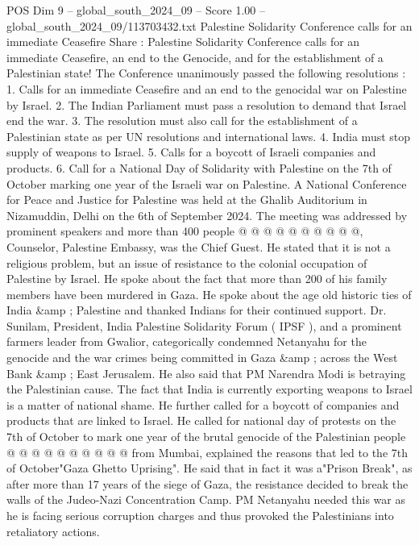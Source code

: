 \begin{textsample}{POS Dim 9 – global\_south\_2024\_09 – Score 1.00 – global\_south\_2024\_09/113703432.txt}  \label{ex:f9_pos_254}
Palestine Solidarity Conference calls for an immediate Ceasefire Share : Palestine Solidarity Conference calls for an immediate Ceasefire, an end to the Genocide, and for the establishment of a Palestinian state!
The Conference unanimously passed the following resolutions : 1.
Calls for an immediate Ceasefire and an end to the genocidal war on Palestine by Israel. 2.
The Indian Parliament must pass a resolution to demand that Israel end the war. 3.
The resolution must also call for the establishment of a Palestinian state as per UN resolutions and international laws. 4.
India must stop supply of weapons to Israel. 5.
Calls for a boycott of Israeli companies and products. 6.
Call for a National Day of Solidarity with Palestine on the 7th of October marking one year of the Israeli war on Palestine.
A National Conference for Peace and Justice for Palestine was held at the Ghalib Auditorium in Nizamuddin, Delhi on the 6th of September 2024.
The meeting was addressed by prominent speakers and more than 400 people @ @ @ @ @ @ @ @ @ @, Counselor, Palestine Embassy, was the Chief Guest.
He stated that it is not a religious problem, but an issue of resistance to the colonial occupation of Palestine by Israel.
He spoke about the fact that more than 200 of his family members have been murdered in Gaza.
He spoke about the age old historic ties of India \&amp ; Palestine and thanked Indians for their continued support.
Dr.
Sunilam, President, India Palestine Solidarity Forum ( IPSF ), and a prominent farmers leader from Gwalior, categorically condemned Netanyahu for the genocide and the war crimes being committed in Gaza \&amp ; across the West Bank \&amp ; East Jerusalem.
He also said that PM Narendra Modi is betraying the Palestinian cause.
The fact that India is currently exporting weapons to Israel is a matter of national shame.
He further called for a boycott of companies and products that are linked to Israel.
He called for national day of protests on the 7th of October to mark one year of the brutal genocide of the Palestinian people @ @ @ @ @ @ @ @ @ @ from Mumbai, explained the reasons that led to the 7th of October"Gaza Ghetto Uprising".
He said that in fact it was a"Prison Break", as after more than 17 years of the siege of Gaza, the resistance decided to break the walls of the Judeo-Nazi Concentration Camp.
PM Netanyahu needed this war as he is facing serious corruption charges and thus provoked the Palestinians into retaliatory actions.

\end{textsample}
